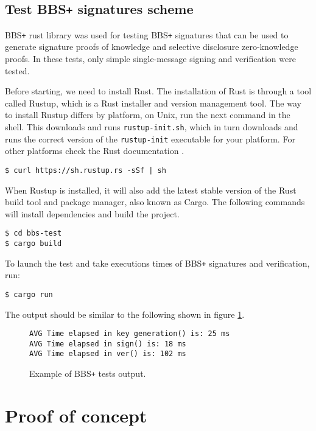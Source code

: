 \subsection{Test BBS\texttt{+} signatures scheme}
BBS\texttt{+} rust library was used for testing BBS\texttt{+} signatures that can be used to generate signature proofs of knowledge and selective disclosure zero-knowledge proofs. In these tests, only simple single-message signing and verification were tested.

Before starting, we need to install Rust. The installation of Rust is through a tool called Rustup, which is a Rust installer and version management tool. The way to install Rustup differs by platform, on Unix, run the next command in the shell. This downloads and runs \texttt{rustup-init.sh}, which in turn downloads and runs the correct version of the \texttt{rustup-init} executable for your platform. For other platforms check the Rust documentation \cite{rust-install}. \\
\begin{lstlisting}[style=terminal,frame=single]
$ curl https://sh.rustup.rs -sSf | sh
\end{lstlisting}
When Rustup is installed, it will also add the latest stable version of the Rust build tool and package manager, also known as Cargo. The following commands will install dependencies and build the project. \\
\begin{lstlisting}[style=terminal,frame=single]
$ cd bbs-test
$ cargo build
\end{lstlisting}
To launch the test and take executions times of BBS\texttt{+} signatures and verification, run:  \\
\begin{lstlisting}[style=terminal,frame=single]
$ cargo run
\end{lstlisting}
The output should be similar to the following shown in figure \ref{l-bbs}. \\
\begin{figure}[H]
\begin{lstlisting}[frame=single]
AVG Time elapsed in key generation() is: 25 ms
AVG Time elapsed in sign() is: 18 ms
AVG Time elapsed in ver() is: 102 ms
\end{lstlisting}
\caption{Example of BBS\texttt{+} tests output. \label{l-bbs}}
\end{figure}

\section{Proof of concept}

